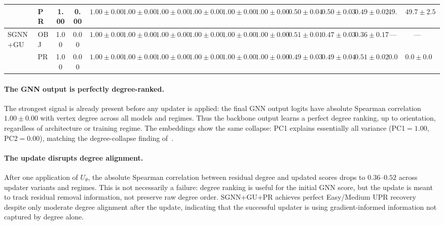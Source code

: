 \documentclass[11pt]{article}
\theoremstyle{plain}
\theoremstyle{remark}
\begin{document}
\begin{table}[t]
{\begin{tabular}{llcccccccccccccc}
      & PR
      & 1.00 & 0.00
      & $1.00\pm0.00$ & $1.00\pm0.00$ & $1.00\pm0.00$
      & $1.00\pm0.00$ & $1.00\pm0.00$ & $1.00\pm0.00$
      & $0.50\pm0.04$ & $0.50\pm0.03$ & $0.49\pm0.02$
      & $49.7$ & $49.7\pm2.5$ \\
      \midrule
      \multirow{2}{*}{SGNN+GU}
      & OBJ
      & 1.00 & 0.00
      & $1.00\pm0.00$ & $1.00\pm0.00$ & $1.00\pm0.00$
      & $1.00\pm0.00$ & $1.00\pm0.00$ & $1.00\pm0.00$
      & $0.51\pm0.01$ & $0.47\pm0.03$ & $0.36\pm0.17$
      & --- & --- \\
      & PR
      & 1.00 & 0.00
      & $1.00\pm0.00$ & $1.00\pm0.00$ & $1.00\pm0.00$
      & $1.00\pm0.00$ & $1.00\pm0.00$ & $1.00\pm0.00$
      & $0.49\pm0.03$ & $0.49\pm0.04$ & $0.51\pm0.02$
      & $\mathbf{0.0}$ & $\mathbf{0.0\pm0.0}$ \\
      \bottomrule
  \end{tabular}}
\end{table}


\paragraph{The GNN output is perfectly degree-ranked.}
The strongest signal is already present before any updater is applied: the final
GNN output logits have absolute Spearman correlation $1.00{\pm}0.00$ with vertex
degree across all models and regimes. Thus the backbone output learns a perfect
degree ranking, up to orientation, regardless of architecture or training regime.
The embeddings show the same collapse: PC1 explains essentially all variance
(PC1$=1.00$, PC2$=0.00$), matching the degree-collapse finding
of~\citet{shoham2026ltr}.

\paragraph{The update disrupts degree alignment.}
After one application of $U_\theta$, the absolute Spearman correlation between
residual degree and updated scores drops to $0.36$--$0.52$ across updater variants
and regimes. This is not necessarily a failure: degree ranking is useful for the
initial GNN score, but the update is meant to track residual removal information,
not preserve raw degree order. SGNN+GU+PR achieves perfect Easy/Medium UPR recovery
despite only moderate degree alignment after the update, indicating that the
successful updater is using gradient-informed information not captured by degree
alone.
\end{document}
